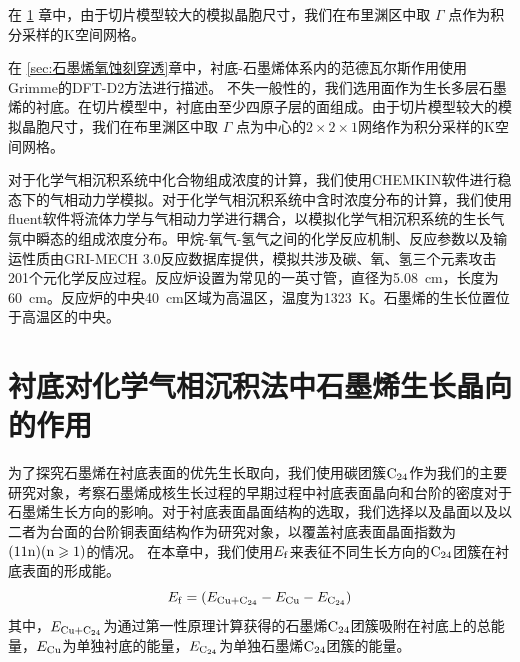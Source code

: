 在 \ref{sec:石墨烯优先生长取向} 章中，由于切片模型较大的模拟晶胞尺寸，我们在布里渊区中取 $\Gamma$ 点作为积分采样的K空间网格。

在 \ref{sec:石墨烯氧蚀刻穿透}章中，衬底-石墨烯体系内的范德瓦尔斯作用使用Grimme的DFT-D2方法进行描述。
不失一般性的，我们选用面作为生长多层石墨烯的衬底。在切片模型中，衬底由至少四原子层的面组成。由于切片模型较大的模拟晶胞尺寸，我们在布里渊区中取 $\Gamma$ 点为中心的$2\times 2\times 1$网络作为积分采样的K空间网格。

对于化学气相沉积系统中化合物组成浓度的计算，我们使用CHEMKIN软件进行稳态下的气相动力学模拟。对于化学气相沉积系统中含时浓度分布的计算，我们使用fluent软件将流体力学与气相动力学进行耦合，以模拟化学气相沉积系统的生长气氛中瞬态的组成浓度分布。甲烷-氧气-氢气之间的化学反应机制、反应参数以及输运性质由GRI-MECH 3.0反应数据库提供，模拟共涉及碳、氧、氢三个元素攻击201个元化学反应过程。反应炉设置为常见的一英寸管，直径为\SI{5.08}{\centi\metre}，长度为\SI{60}{\centi\metre}。反应炉的中央\SI{40}{\centi\metre}区域为高温区，温度为\SI{1323}{\kelvin}。石墨烯的生长位置位于高温区的中央。

\section{衬底对化学气相沉积法中石墨烯生长晶向的作用}
\label{sec:石墨烯优先生长取向}
为了探究石墨烯在衬底表面的优先生长取向，我们使用碳团簇$\rm{C_{24}}$作为我们的主要研究对象，考察石墨烯成核生长过程的早期过程中衬底表面晶向和台阶的密度对于石墨烯生长方向的影响。对于衬底表面晶面结构的选取，我们选择以及晶面以及以二者为台面的台阶铜表面结构作为研究对象，以覆盖衬底表面晶面指数为$\rm{(11n)(n \geqslant 1)}$的情况。
在本章中，我们使用$E_{\rm{f}}$来表征不同生长方向的$\rm{C_{24}}$团簇在衬底表面的形成能。
\begin{equation}
    E_{\rm{f}}=
    (E_{\rm{Cu+\rm{C_{24}}}}-E_{\rm{Cu}}-E_{\rm{\rm{C_{24}}}})
\end{equation}
其中，$E_{\rm{Cu+\rm{C_{24}}}}$为通过第一性原理计算获得的石墨烯$\rm{C_{24}}$团簇吸附在衬底上的总能量，$E_{\rm{Cu}}$为单独衬底的能量，$E_{\rm{\rm{C_{24}}}}$为单独石墨烯$\rm{C_{24}}$团簇的能量。

